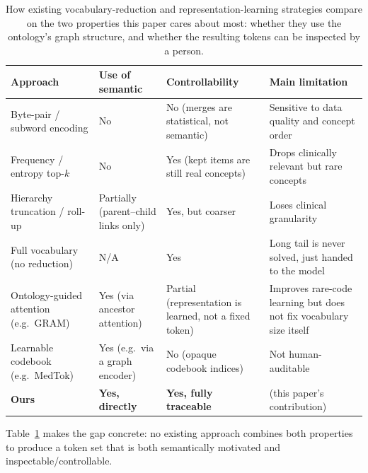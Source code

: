 \begin{table}[h]
\centering
\small
\begin{tabular}{p{2.7cm}p{1.8cm}p{2.0cm}p{4.5cm}}
\toprule
\textbf{Approach} & \textbf{Use of semantic} & \textbf{Controllability} & \textbf{Main limitation} \\
\midrule
Byte-pair / subword encoding & No & No (merges are statistical, not semantic) & Sensitive to data quality and concept order \\
Frequency / entropy top-$k$ & No & Yes (kept items are still real concepts) & Drops clinically relevant but rare concepts \\
Hierarchy truncation / roll-up & Partially (parent--child links only) & Yes, but coarser & Loses clinical granularity \\
Full vocabulary (no reduction) & N/A & Yes & Long tail is never solved, just handed to the model \\
Ontology-guided attention (e.g.\ GRAM) & Yes (via ancestor attention) & Partial (representation is learned, not a fixed token) & Improves rare-code learning but does not fix vocabulary size itself \\
Learnable codebook (e.g.\ MedTok) & Yes (e.g.\ via a graph encoder) & No (opaque codebook indices) & Not human-auditable \\
\textbf{Ours} & \textbf{Yes, directly} & \textbf{Yes, fully traceable} & (this paper's contribution) \\
\bottomrule
\end{tabular}
\caption{How existing vocabulary-reduction and representation-learning strategies compare on the two properties this paper cares about most: whether they use the ontology's graph structure, and whether the resulting tokens can be inspected by a person.}
\label{tab:related-approaches}
\end{table}

Table~\ref{tab:related-approaches} makes the gap concrete: no existing approach combines both properties to produce a token set that is both semantically motivated and inspectable/controllable.

